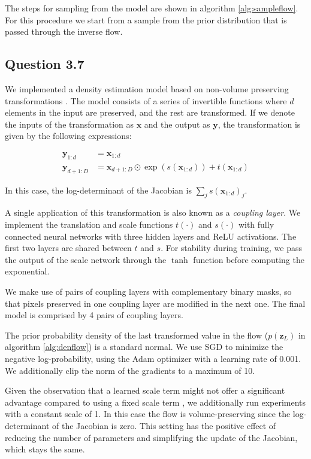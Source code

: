 \documentclass{article}
\begin{document}
The steps for sampling from the model are shown in algorithm \ref{alg:sampleflow}. For this procedure we start from a sample from the prior distribution that is passed through the inverse flow.

\subsection*{Question 3.7}

We implemented a density estimation model based on non-volume preserving transformations \cite{dinh2017rnvp}. The model consists of a series of invertible functions where $d$ elements in the input are preserved, and the rest are transformed. If we denote the inputs of the transformation as $\mathbf{x}$ and the output as $\mathbf{y}$, the transformation is given by the following expressions:

\begin{align*}
\mathbf{y}_{1:d} &= \mathbf{x}_{1:d} \\
\mathbf{y}_{d + 1:D} &= \mathbf{x}_{d + 1:D} \odot \exp\left( s(\mathbf{x}_{1:d}) \right) + t(\mathbf{x}_{1:d})
\end{align*}

In this case, the log-determinant of the Jacobian is $\sum_j s(\mathbf{x}_{1:d})_j$.

A single application of this transformation is also known as a \textit{coupling layer}. We implement the translation and scale functions $t(\cdot)$ and $s(\cdot)$ with fully connected neural networks with three hidden layers and ReLU activations. The first two layers are shared between $t$ and $s$. For stability during training, we pass the output of the scale network through the $\tanh$ function before computing the exponential.

We make use of pairs of coupling layers with complementary binary masks, so that pixels preserved in one coupling layer are modified in the next one. The final model is comprised by 4 pairs of coupling layers.

The prior probability density of the last transformed value in the flow ($p(\mathbf{z}_L)$ in algorithm \ref{alg:denflow}) is a standard normal. We use SGD to minimize the negative log-probability, using the Adam optimizer \cite{kingma2014adam} with a learning rate of 0.001. We additionally clip the norm of the gradients to a maximum of 10.

Given the observation that a learned scale term might not offer a significant advantage compared to using a fixed scale term \cite{kingma2016improved}, we additionally run experiments with a constant scale of 1. In this case the flow is volume-preserving since the log-determinant of the Jacobian is zero. This setting has the positive effect of reducing the number of parameters and simplifying the update of the Jacobian, which stays the same.
\end{document}
